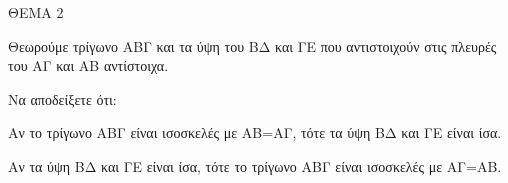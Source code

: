 
ΘΕΜΑ 2

Θεωρούμε τρίγωνο ΑΒΓ και τα ύψη του ΒΔ και ΓΕ που αντιστοιχούν στις πλευρές του ΑΓ και ΑΒ αντίστοιχα.

Να αποδείξετε ότι:

\begin{alist}
\item Αν το τρίγωνο ΑΒΓ είναι ισοσκελές με ΑΒ=ΑΓ, τότε τα ύψη ΒΔ και ΓΕ είναι ίσα.


\item Αν τα ύψη ΒΔ και ΓΕ είναι ίσα, τότε το τρίγωνο ΑΒΓ είναι ισοσκελές με ΑΓ=ΑΒ.

\end{alist}
